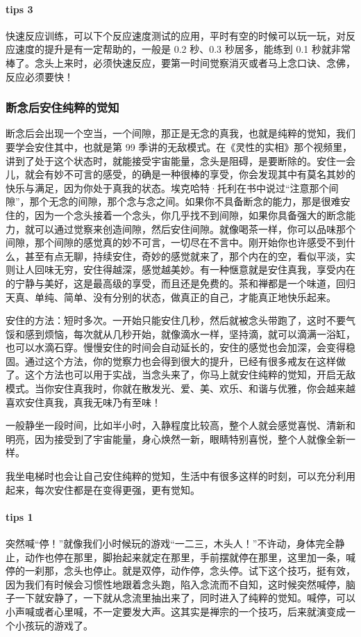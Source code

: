 \paragraph{tips 3} 快速反应训练，可以下个反应速度测试的应用，平时有空的时候可以玩一玩，对反应速度的提升是有一定帮助的，一般是 0.2 秒、0.3 秒居多，能练到 0.1 秒就非常棒了。念头上来时，必须快速反应，要第一时间觉察消灭或者马上念口诀、念佛，反应必须要快！

\subsubsection{断念后安住纯粹的觉知}

断念后会出现一个空当，一个间隙，那正是无念的真我，也就是纯粹的觉知，我们要学会安住其中，也就是第 99 季讲的无敌模式。在《灵性的实相》那个视频里，讲到了处于这个状态时，就能接受宇宙能量，念头是阻碍，是要断除的。安住一会儿，就会有妙不可言的感受，的确是一种很棒的享受，你会发现其中有莫名其妙的快乐与满足，因为你处于真我的状态。埃克哈特·托利在书中说过“注意那个间隙”，那个无念的间隙，那个念与念之间。如果你不具备断念的能力，那是很难安住的，因为一个念头接着一个念头，你几乎找不到间隙，如果你具备强大的断念能力，就可以通过觉察来创造间隙，然后安住间隙。就像喝茶一样，你可以品味那个间隙，那个间隙的感觉真的妙不可言，一切尽在不言中。刚开始你也许感受不到什么，甚至有点无聊，持续安住，奇妙的感觉就来了，那个内在的空，看似平淡，实则让人回味无穷，安住得越深，感觉越美妙。有一种惬意就是安住真我，享受内在的宁静与美好，这是最高级的享受，而且还是免费的。茶和禅都是一个味道，回归天真、单纯、简单、没有分别的状态，做真正的自己，才能真正地快乐起来。

安住的方法：短时多次。一开始只能安住几秒，然后就被念头带跑了，这时不要气馁和感到烦恼，每次就从几秒开始，就像滴水一样，坚持滴，就可以滴满一浴缸，也可以水滴石穿。慢慢安住的时间会自动延长的，安住的感觉也会加深，会变得稳固。通过这个方法，你的觉察力也会得到很大的提升，已经有很多戒友在这样做了。这个方法也可以用于实战，当念头来了，你马上就安住纯粹的觉知，开启无敌模式。当你安住真我时，你就在散发光、爱、美、欢乐、和谐与优雅，你会越来越喜欢安住真我，真我无味乃有至味！

一般静坐一段时间，比如半小时，入静程度比较高，整个人就会感觉喜悦、清新和明亮，因为接受到了宇宙能量，身心焕然一新，眼睛特别喜悦，整个人就像全新一样。

我坐电梯时也会让自己安住纯粹的觉知，生活中有很多这样的时刻，可以充分利用起来，每次安住都是在变得更强，更有觉知。

\paragraph{tips 1} 突然喊“停！”就像我们小时候玩的游戏“一二三，木头人！”不许动，身体完全静止，动作也停在那里，脚抬起来就定在那里，手前摆就停在那里，这里加一条，喊停的一刹那，念头也停止。就是双停，动作停，念头停。试下这个技巧，挺有效，因为我们有时候会习惯性地跟着念头跑，陷入念流而不自知，这时候突然喊停，脑子一下就安静了，一下就从念流里抽出来了，同时进入了纯粹的觉知。喊停，可以小声喊或者心里喊，不一定要发大声。这其实是禅宗的一个技巧，后来就演变成一个小孩玩的游戏了。

